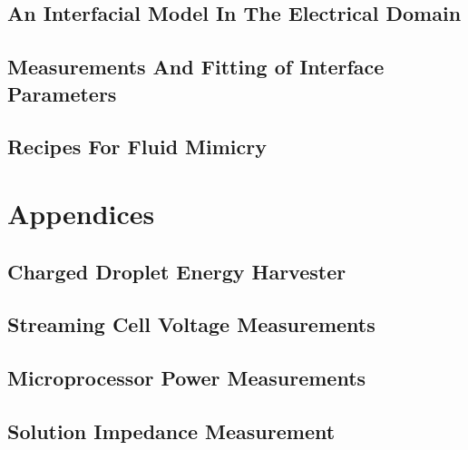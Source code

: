   \chapter{An Interfacial Model In The Electrical Domain}
    \label{chap:theInterfaceModel}
    

  \chapter{Measurements And Fitting of Interface Parameters}
    \label{chap:modellingSaline}
    

  \chapter{Recipes For Fluid Mimicry}
    \label{chap:fluid_mimicry}
    

\part{Appendices}

  \appendix

  \chapter{Charged Droplet Energy Harvester}
    \label{appendix:chargedDropletts}
    

  \chapter{Streaming Cell Voltage Measurements}
    \label{appendix:streamingCellMeasurements}
    

  \chapter{Microprocessor Power Measurements}
    

  \chapter{Solution Impedance Measurement}
    

